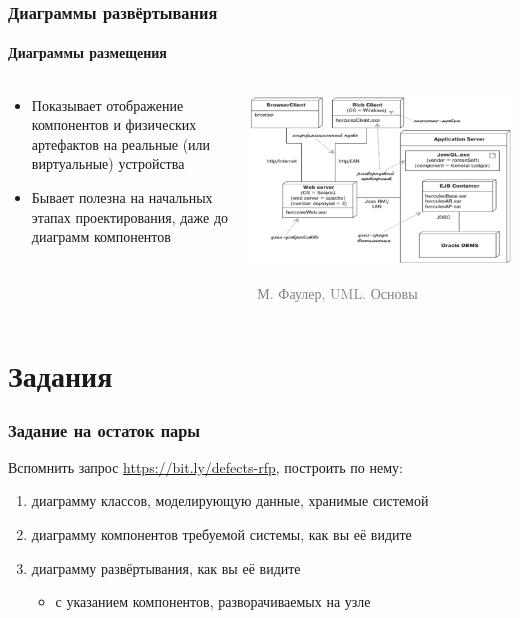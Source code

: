 \documentclass[xetex,mathserif,serif]{beamer}
\newcommand{\attribution}[1] {
    \vspace{-5mm}\begin{flushright}\begin{scriptsize}\textcolor{gray}{\textcopyright\, #1}\end{scriptsize}\end{flushright}
}
\begin{document}
    \begin{frame}
        \frametitle{Диаграммы развёртывания}
        \framesubtitle{Диаграммы размещения}
        \begin{columns}
            \begin{column}{0.5\textwidth}
                \begin{itemize}
                    \item Показывает отображение компонентов и физических артефактов на реальные (или виртуальные) устройства
                    \item Бывает полезна на начальных этапах проектирования, даже до диаграмм компонентов
                \end{itemize}
            \end{column}
            \begin{column}{0.5\textwidth}
                \begin{center}
                    \includegraphics[width=\textwidth]{deploymentDiagram.png}
                    \attribution{М. Фаулер, UML. Основы}
                \end{center}
            \end{column}
        \end{columns}
    \end{frame}

    \section{Задания}

    \begin{frame}
        \frametitle{Задание на остаток пары}
        Вспомнить запрос \url{https://bit.ly/defects-rfp}, построить по нему:
        \begin{enumerate}
            \item диаграмму классов, моделирующую данные, хранимые системой
            \item диаграмму компонентов требуемой системы, как вы её видите
            \item диаграмму развёртывания, как вы её видите
            \begin{itemize}
                \item с указанием компонентов, разворачиваемых на узле
            \end{itemize}
        \end{enumerate}
    \end{frame}
\end{document}
